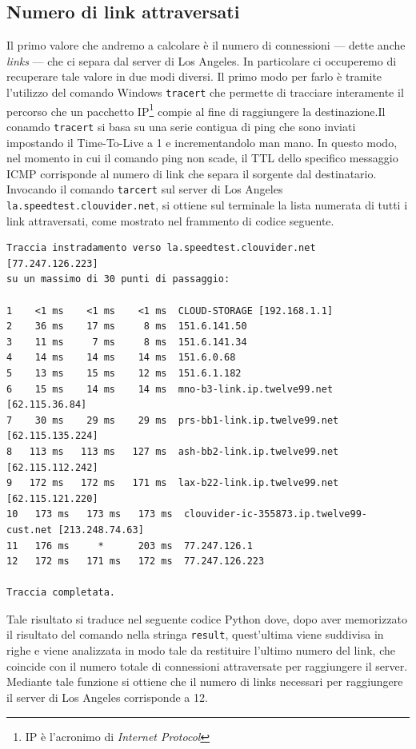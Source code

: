 \vspace{15px}\subsection{Numero di link attraversati}\label{links}

Il primo valore che andremo a calcolare è il numero di connessioni — dette anche \textsl{links} — che ci separa dal server di Los Angeles. In particolare ci occuperemo di recuperare tale valore in due modi diversi. Il primo modo per farlo è tramite l'utilizzo del comando Windows \texttt{tracert} che permette di tracciare interamente il percorso che un pacchetto IP\footnote{IP è l'acronimo di \textsl{Internet Protocol}} compie al fine di raggiungere la destinazione.Il conamdo \texttt{tracert} si basa su una serie contigua di ping che sono inviati impostando il Time-To-Live a 1 e incrementandolo man mano. In questo modo, nel momento in cui il comando ping non scade, il TTL dello specifico messaggio ICMP corrisponde al numero di link che separa il sorgente dal destinatario. Invocando il comando \texttt{tarcert} sul server di Los Angeles \texttt{la.speedtest.clouvider.net}, si ottiene sul terminale la lista numerata di tutti i link attraversati, come mostrato nel frammento di codice seguente. 

\begin{lstlisting}[style = bash]
Traccia instradamento verso la.speedtest.clouvider.net [77.247.126.223]
su un massimo di 30 punti di passaggio:

1    <1 ms    <1 ms    <1 ms  CLOUD-STORAGE [192.168.1.1] 
2    36 ms    17 ms     8 ms  151.6.141.50 
3    11 ms     7 ms     8 ms  151.6.141.34 
4    14 ms    14 ms    14 ms  151.6.0.68 
5    13 ms    15 ms    12 ms  151.6.1.182 
6    15 ms    14 ms    14 ms  mno-b3-link.ip.twelve99.net [62.115.36.84] 
7    30 ms    29 ms    29 ms  prs-bb1-link.ip.twelve99.net [62.115.135.224] 
8   113 ms   113 ms   127 ms  ash-bb2-link.ip.twelve99.net [62.115.112.242] 
9   172 ms   172 ms   171 ms  lax-b22-link.ip.twelve99.net [62.115.121.220] 
10   173 ms   173 ms   173 ms  clouvider-ic-355873.ip.twelve99-cust.net [213.248.74.63] 
11   176 ms     *      203 ms  77.247.126.1 
12   172 ms   171 ms   172 ms  77.247.126.223 

Traccia completata.
\end{lstlisting}

\noindent Tale risultato si traduce nel seguente codice Python dove, dopo aver memorizzato il risultato del comando nella stringa \texttt{result}, quest'ultima viene suddivisa in righe e viene analizzata in modo tale da restituire l'ultimo numero del link, che coincide con il numero totale di connessioni attraversate per raggiungere il server. Mediante tale funzione si ottiene che il numero di links necessari per raggiungere il server di Los Angeles corrisponde a 12.

